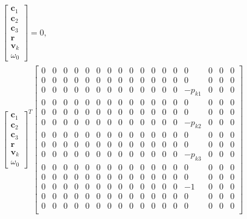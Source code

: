 \documentclass{article}
\newcommand{\mbf}[1]{\mathbf{#1}}
\begin{document}
\begin{align}
    \begin{bmatrix}
        \mbf{c}_1 \\
        \mbf{c}_2 \\
        \mbf{c}_3 \\
        \mbf{r} \\
        \mbf{v}_k \\
        \omega_0
    \end{bmatrix} = 0, \\
    \begin{bmatrix}
        \mbf{c}_1 \\
        \mbf{c}_2 \\
        \mbf{c}_3 \\
        \mbf{r} \\
        \mbf{v}_k \\
        \omega_0
    \end{bmatrix}^T 
    \begin{bmatrix}
        0 & 0 & 0 & 0 & 0 & 0 & 0 & 0 & 0 & 0 & 0 & 0 & 0 & 0 & 0 & 0 & 0 \\
        0 & 0 & 0 & 0 & 0 & 0 & 0 & 0 & 0 & 0 & 0 & 0 & 0 & 0 & 0 & 0 & 0 \\
        0 & 0 & 0 & 0 & 0 & 0 & 0 & 0 & 0 & 0 & 0 & 0 & 0 & -p_{k1} & 0 & 0 & 0 \\
        0 & 0 & 0 & 0 & 0 & 0 & 0 & 0 & 0 & 0 & 0 & 0 & 0 & 0 & 0 & 0 & 0 \\
        0 & 0 & 0 & 0 & 0 & 0 & 0 & 0 & 0 & 0 & 0 & 0 & 0 & 0 & 0 & 0 & 0 \\
        0 & 0 & 0 & 0 & 0 & 0 & 0 & 0 & 0 & 0 & 0 & 0 & 0 & -p_{k2} & 0 & 0 & 0 \\
        0 & 0 & 0 & 0 & 0 & 0 & 0 & 0 & 0 & 0 & 0 & 0 & 0 & 0 & 0 & 0 & 0 \\
        0 & 0 & 0 & 0 & 0 & 0 & 0 & 0 & 0 & 0 & 0 & 0 & 0 & 0 & 0 & 0 & 0 \\
        0 & 0 & 0 & 0 & 0 & 0 & 0 & 0 & 0 & 0 & 0 & 0 & 0 & -p_{k3} & 0 & 0 & 0 \\
        0 & 0 & 0 & 0 & 0 & 0 & 0 & 0 & 0 & 0 & 0 & 0 & 0 & 0 & 0 & 0 & 0 \\
        0 & 0 & 0 & 0 & 0 & 0 & 0 & 0 & 0 & 0 & 0 & 0 & 0 & 0 & 0 & 0 & 0 \\
        0 & 0 & 0 & 0 & 0 & 0 & 0 & 0 & 0 & 0 & 0 & 0 & 0 & -1 & 0 & 0 & 0 \\
        0 & 0 & 0 & 0 & 0 & 0 & 0 & 0 & 0 & 0 & 0 & 0 & 0 & 0 & 0 & 0 & 0 \\
        0 & 0 & 0 & 0 & 0 & 0 & 0 & 0 & 0 & 0 & 0 & 0 & 0 & 0 & 0 & 0 & 0 \\

\end{bmatrix}
\end{align}
\end{document}

